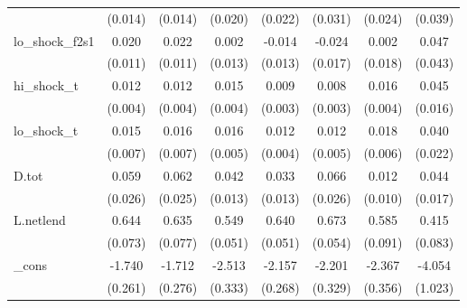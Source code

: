 {\begin{tabular}{l*{7}{c}}
            &     (0.014)         &     (0.014)         &     (0.020)         &     (0.022)         &     (0.031)         &     (0.024)         &     (0.039)         \\
\addlinespace
lo\_shock\_f2s1&       0.020\sym{*}  &       0.022\sym{*}  &       0.002         &      -0.014         &      -0.024         &       0.002         &       0.047         \\
            &     (0.011)         &     (0.011)         &     (0.013)         &     (0.013)         &     (0.017)         &     (0.018)         &     (0.043)         \\
\addlinespace
hi\_shock\_t  &       0.012\sym{**} &       0.012\sym{***}&       0.015\sym{***}&       0.009\sym{***}&       0.008\sym{**} &       0.016\sym{***}&       0.045\sym{**} \\
            &     (0.004)         &     (0.004)         &     (0.004)         &     (0.003)         &     (0.003)         &     (0.004)         &     (0.016)         \\
\addlinespace
lo\_shock\_t  &       0.015\sym{**} &       0.016\sym{**} &       0.016\sym{***}&       0.012\sym{***}&       0.012\sym{**} &       0.018\sym{***}&       0.040\sym{*}  \\
            &     (0.007)         &     (0.007)         &     (0.005)         &     (0.004)         &     (0.005)         &     (0.006)         &     (0.022)         \\
\addlinespace
D.tot       &       0.059\sym{**} &       0.062\sym{**} &       0.042\sym{***}&       0.033\sym{**} &       0.066\sym{**} &       0.012         &       0.044\sym{**} \\
            &     (0.026)         &     (0.025)         &     (0.013)         &     (0.013)         &     (0.026)         &     (0.010)         &     (0.017)         \\
\addlinespace
L.netlend   &       0.644\sym{***}&       0.635\sym{***}&       0.549\sym{***}&       0.640\sym{***}&       0.673\sym{***}&       0.585\sym{***}&       0.415\sym{***}\\
            &     (0.073)         &     (0.077)         &     (0.051)         &     (0.051)         &     (0.054)         &     (0.091)         &     (0.083)         \\
\addlinespace
\_cons      &      -1.740\sym{***}&      -1.712\sym{***}&      -2.513\sym{***}&      -2.157\sym{***}&      -2.201\sym{***}&      -2.367\sym{***}&      -4.054\sym{***}\\
            &     (0.261)         &     (0.276)         &     (0.333)         &     (0.268)         &     (0.329)         &     (0.356)         &     (1.023)         \\

\end{tabular}}
